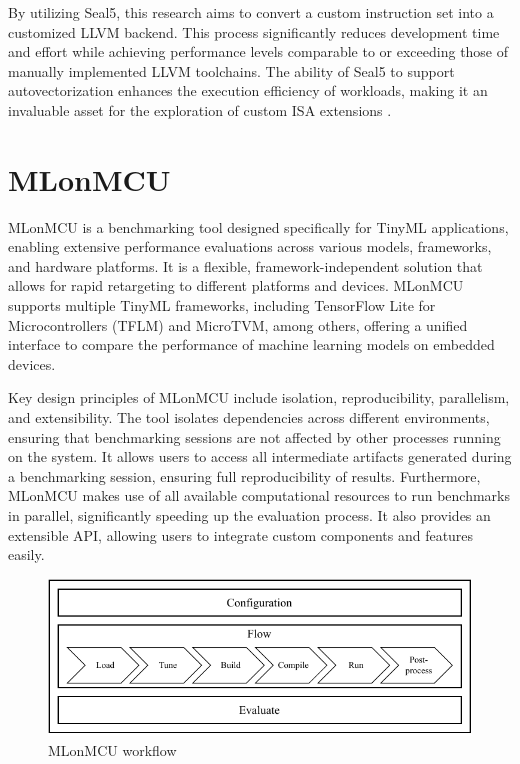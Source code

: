 By utilizing Seal5, this research aims to convert a custom instruction set into a customized LLVM backend. This process significantly reduces development time and effort while achieving performance levels comparable to or exceeding those of manually implemented LLVM toolchains. The ability of Seal5 to support autovectorization enhances the execution efficiency of workloads, making it an invaluable asset for the exploration of custom ISA extensions \cite{Seal5}.

\section{MLonMCU}
MLonMCU is a benchmarking tool designed specifically for TinyML applications, enabling extensive performance evaluations across various models, frameworks, and hardware platforms. It is a flexible, framework-independent solution that allows for rapid retargeting to different platforms and devices. MLonMCU supports multiple TinyML frameworks, including TensorFlow Lite for Microcontrollers (TFLM) and MicroTVM, among others, offering a unified interface to compare the performance of machine learning models on embedded devices.

Key design principles of MLonMCU include isolation, reproducibility, parallelism, and extensibility. The tool isolates dependencies across different environments, ensuring that benchmarking sessions are not affected by other processes running on the system. It allows users to access all intermediate artifacts generated during a benchmarking session, ensuring full reproducibility of results. Furthermore, MLonMCU makes use of all available computational resources to run benchmarks in parallel, significantly speeding up the evaluation process. It also provides an extensible API, allowing users to integrate custom components and features easily.

\begin{figure}[ht]
    \centering
    \includegraphics[width=\linewidth]{figures/MLonMCUStructureNew.pdf}
    \caption{MLonMCU workflow \cite{MLonMCU}}
    \label{fig:mlonmcu}
\end{figure}

